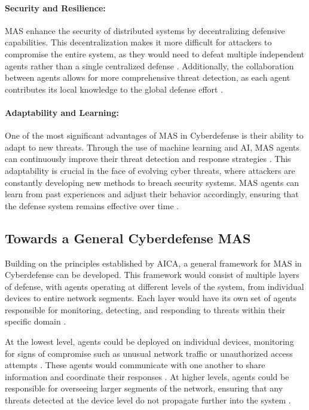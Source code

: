 \paragraph{Security and Resilience:}
MAS enhance the security of distributed systems by decentralizing defensive capabilities. This decentralization makes it more difficult for attackers to compromise the entire system, as they would need to defeat multiple independent agents rather than a single centralized defense \cite{jajodia2005topological}. Additionally, the collaboration between agents allows for more comprehensive threat detection, as each agent contributes its local knowledge to the global defense effort \cite{buczak2016survey}.

\paragraph{Adaptability and Learning:}
One of the most significant advantages of MAS in Cyberdefense is their ability to adapt to new threats. Through the use of machine learning and AI, MAS agents can continuously improve their threat detection and response strategies \cite{buczak2016survey}. This adaptability is crucial in the face of evolving cyber threats, where attackers are constantly developing new methods to breach security systems. MAS agents can learn from past experiences and adjust their behavior accordingly, ensuring that the defense system remains effective over time \cite{debar1999towards}.

\subsection{Towards a General Cyberdefense MAS}

Building on the principles established by AICA, a general framework for MAS in Cyberdefense can be developed. This framework would consist of multiple layers of defense, with agents operating at different levels of the system, from individual devices to entire network segments. Each layer would have its own set of agents responsible for monitoring, detecting, and responding to threats within their specific domain \cite{bou-harb2017cyber}.

At the lowest level, agents could be deployed on individual devices, monitoring for signs of compromise such as unusual network traffic or unauthorized access attempts \cite{kolias2016swarm}. These agents would communicate with one another to share information and coordinate their responses \cite{shamshirband2018computational}. At higher levels, agents could be responsible for overseeing larger segments of the network, ensuring that any threats detected at the device level do not propagate further into the system \cite{hu2018mimic}.

